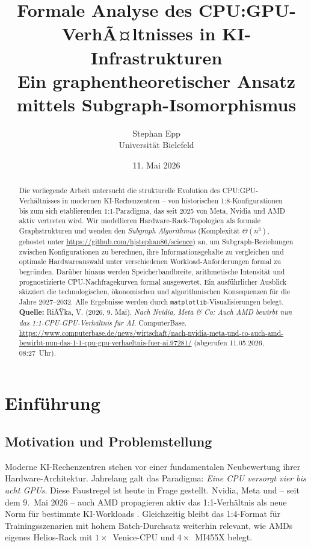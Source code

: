 ﻿\documentclass[a4paper,12pt]{article}
\title{\textbf{Formale Analyse des CPU:GPU-VerhÃ¤ltnisses in KI-Infrastrukturen}\\[0.4em]
\large Ein graphentheoretischer Ansatz mittels Subgraph-Isomorphismus}
\author{Stephan Epp\\
\small Universit\"at Bielefeld}
\date{11. Mai 2026}
\theoremstyle{definition}
\begin{document}
\maketitle

\begin{abstract}
Die vorliegende Arbeit untersucht die strukturelle Evolution des CPU:GPU-Verh\"altnisses
in modernen KI-Rechenzentren -- von historischen 1:8-Konfigurationen bis zum sich
etablierenden 1:1-Paradigma, das seit 2025 von Meta, Nvidia und AMD aktiv vertreten wird.
Wir modellieren Hardware-Rack-Topologien als formale Graphstrukturen und wenden den
\emph{Subgraph Algorithmus} \cite{epp2026subgraph} (Komplexit\"at $\Theta(n^3)$,
gehostet unter \url{https://github.com/hjstephan86/science}) an, um Subgraph-Beziehungen
zwischen Konfigurationen zu berechnen, ihre Informationsgehalte zu vergleichen und
optimale Hardwareauswahl unter verschiedenen Workload-Anforderungen formal zu begr\"unden.
Dar\"uber hinaus werden Speicherbandbreite, arithmetische Intensit\"at und prognostizierte
CPU-Nachfragekurven formal ausgewertet. Ein ausf\"uhrlicher Ausblick skizziert die
technologischen, \"okonomischen und algorithmischen Konsequenzen f\"ur die Jahre
2027--2032. Alle Ergebnisse werden durch \texttt{matplotlib}-Visualisierungen belegt.\\[0.5em]
\textbf{Quelle:} RiÃŸka, V. (2026, 9. Mai). \textit{Nach Nvidia, Meta \& Co: Auch AMD bewirbt nun das 1:1-CPU-GPU-Verh\"altnis f\"ur AI}. ComputerBase.
\url{https://www.computerbase.de/news/wirtschaft/nach-nvidia-meta-und-co-auch-amd-bewirbt-nun-das-1-1-cpu-gpu-verhaeltnis-fuer-ai.97281/}
(abgerufen 11.05.2026, 08:27~Uhr).
\end{abstract}

\tableofcontents
\newpage

\section{Einf\"uhrung}

\subsection{Motivation und Problemstellung}

Moderne KI-Rechenzentren stehen vor einer fundamentalen Neubewertung ihrer
Hardware-Architektur. Jahrelang galt das Paradigma: \emph{Eine CPU versorgt vier bis acht
GPUs.} Diese Faustregel ist heute in Frage gestellt. Nvidia, Meta und -- seit dem
9.~Mai 2026 -- auch AMD propagieren aktiv das 1:1-Verh\"altnis als neue Norm f\"ur
bestimmte KI-Workloads \cite{computerbase2026}. Gleichzeitig bleibt das 1:4-Format
f\"ur Trainingsszenarien mit hohem Batch-Durchsatz weiterhin relevant, wie AMDs eigenes
Helios-Rack mit $1\times$~Venice-CPU und $4\times$~MI455X belegt.
\end{document}
